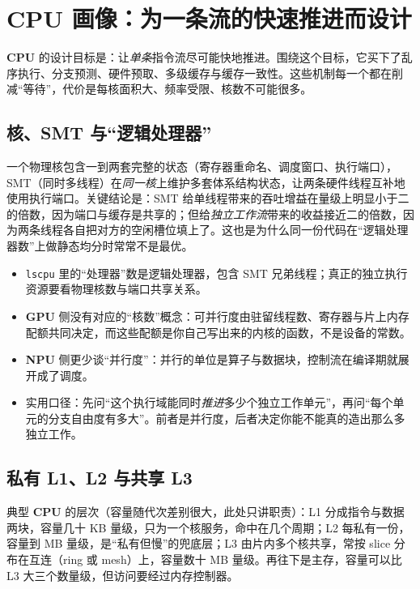 \documentclass[12pt,a4paper,fontset=fandol]{ctexbook}
\newcommand{\Tp}[1]{\texttt{#1}}
\newcommand{\Dom}[1]{\textsf{\bfseries #1}}
\newcommand{\CPU}{\Dom{CPU}}
\newcommand{\GPU}{\Dom{GPU}}
\newcommand{\NPU}{\Dom{NPU}}
\begin{document}
\section{CPU 画像：为一条流的快速推进而设计}

\CPU{} 的设计目标是：让\emph{单条}指令流尽可能快地推进。围绕这个目标，它买下了乱序执行、分支预测、硬件预取、多级缓存与缓存一致性。这些机制每一个都在削减``等待''，代价是每核面积大、频率受限、核数不可能很多。

\subsection{核、SMT 与``逻辑处理器''}

一个物理核包含一到两套完整的状态（寄存器重命名、调度窗口、执行端口），SMT（同时多线程）在\emph{同一核}上维护多套体系结构状态，让两条硬件线程互补地使用执行端口。关键结论是：SMT 给单线程带来的吞吐增益在量级上明显小于二的倍数，因为端口与缓存是共享的；但给\emph{独立工作流}带来的收益接近二的倍数，因为两条线程各自把对方的空闲槽位填上了。这也是为什么同一份代码在``逻辑处理器数''上做静态均分时常常不是最优。

\begin{note}[title={``核数''与``可并行度''不是一回事}]
\begin{itemize}
\item \Tp{lscpu} 里的``处理器''数是逻辑处理器，包含 SMT 兄弟线程；真正的独立执行资源要看物理核数与端口共享关系。
\item \GPU{} 侧没有对应的``核数''概念：可并行度由驻留线程数、寄存器与片上内存配额共同决定，而这些配额是你自己写出来的内核的函数，不是设备的常数。
\item \NPU{} 侧更少谈``并行度''：并行的单位是算子与数据块，控制流在编译期就展开成了调度。
\item 实用口径：先问``这个执行域能同时\emph{推进}多少个独立工作单元''，再问``每个单元的分支自由度有多大''。前者是并行度，后者决定你能不能真的造出那么多独立工作。
\end{itemize}
\end{note}

\subsection{私有 L1、L2 与共享 L3}

典型 \CPU{} 的层次（容量随代次差别很大，此处只讲职责）：L1 分成指令与数据两块，容量几十 KB 量级，只为一个核服务，命中在几个周期；L2 每私有一份，容量到 MB 量级，是``私有但慢''的兜底层；L3 由片内多个核共享，常按 slice 分布在互连（ring 或 mesh）上，容量数十 MB 量级。再往下是主存，容量可以比 L3 大三个数量级，但访问要经过内存控制器。
\end{document}
